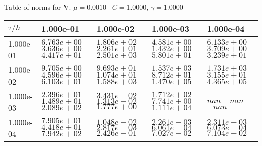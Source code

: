 \begin{center}
Table of norms for V. $\mu = 0.0010$ \, $C = 1.0000$, $\gamma = 1.0000$
  
\begin{tabular}{|p{1in}|p{1in}|p{1in}|p{1in}|p{1in}|} \hline
$\tau / h$ &1.000e-01 &1.000e-02 &1.000e-03 &1.000e-04 \\ \hline 
1.000e-01 & $6.763e+00$  $3.636e+00$  $4.417e+01$  & $1.806e+02$  $2.261e+01$  $2.501e+03$  & $4.581e+00$  $1.432e+00$  $5.801e+01$  & $6.133e+00$  $3.709e+00$  $3.239e+01$  \\ \hline 
1.000e-02 & $9.705e+00$  $4.596e+00$  $6.103e+01$  & $9.693e+01$  $1.074e+01$  $1.588e+03$  & $1.537e+03$  $8.712e+01$  $1.470e+05$  & $1.731e+03$  $3.155e+01$  $4.365e+05$  \\ \hline 
1.000e-03 & $2.396e+01$  $1.489e+01$  $2.089e+02$  & $3.431e-02$  $1.313e-02$  $1.777e+00$  & $1.712e+02$  $7.741e+00$  $1.111e+04$  & $nan$  $-nan$  $-nan$  \\ \hline 
1.000e-04 & $7.905e+01$  $4.418e+01$  $7.942e+02$  & $1.048e-02$  $2.817e-03$  $2.426e-01$  & $2.261e-03$  $6.061e-04$  $7.027e-02$  & $2.311e-03$  $6.073e-04$  $7.104e-02$  \\ \hline 

\end{tabular}\\[20pt]
\end{center}

